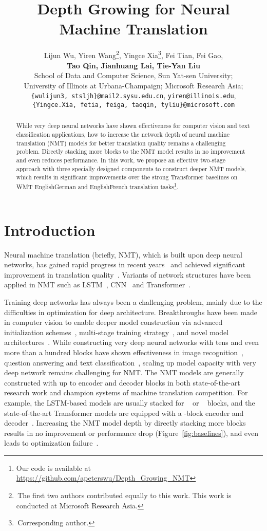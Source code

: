 \documentclass[11pt,a4paper]{article}
\title{Depth Growing for Neural Machine Translation}
\author{Lijun Wu, Yiren Wang\thanks{\;\,The first two authors contributed equally to this work. This work is conducted at Microsoft Research Asia.}, Yingce Xia\thanks{\;\,Corresponding author.}, Fei Tian, Fei Gao, \\ {\bf Tao Qin, Jianhuang Lai, Tie{-}Yan Liu }\\
  School of Data and Computer Science, Sun Yat-sen University;\\  University of Illinois at Urbana-Champaign;  Microsoft Research Asia;\\
  \texttt{\{wulijun3, stsljh\}@mail2.sysu.edu.cn}, \texttt{yiren@illinois.edu}, \\
  \texttt{\{Yingce.Xia, fetia, feiga, taoqin, tyliu\}@microsoft.com}}
\begin{document}
\maketitle
\begin{abstract}
While very deep neural networks have shown effectiveness for computer vision and text classification applications, how to increase the network depth of neural machine translation (NMT) models for better translation quality remains a challenging problem.
Directly stacking more blocks to the NMT model results in no improvement and even reduces performance. In this work, we propose an effective two-stage approach with three specially designed components to construct deeper NMT models, which results in significant improvements over the strong Transformer baselines on WMT EnglishGerman and EnglishFrench translation tasks\footnote{{Our code is available at \url{https://github.com/apeterswu/Depth_Growing_NMT}}}.
\end{abstract}

\section{Introduction}

Neural machine translation (briefly, NMT), which is built upon deep neural networks, has gained rapid progress in recent years~\citep{bahdanau2015neural,sutskever2014sequence,sennrich2016neural,he2016dual,sennrich2016improving,xia2017deliberation,wang2018multiagent} and achieved significant improvement in translation quality~\citep{hassan2018achieving}. Variants of network structures have been applied in NMT such as LSTM~\citep{wu2016google}, CNN~\citep{gehring2017convolutional} and Transformer~\citep{vaswani2017attention}.

Training deep networks has always been a challenging problem, mainly due to the difficulties in optimization for deep architecture. Breakthroughs have been made in computer vision to enable deeper model construction via advanced initialization schemes~\citep{he2015delving}, multi-stage training strategy~\citep{simonyan2015very}, and novel model architectures~\citep{srivastava2015highway,he2016deep}. While constructing very deep neural networks with tens and even more than a hundred blocks have shown effectiveness in image recognition~\citep{he2016deep}, question answering and text classification~\citep{devlin2018bert,radford2019language}, scaling up model capacity with very deep network remains challenging for NMT. The NMT models are generally constructed with up to  encoder and decoder blocks in both state-of-the-art research work and champion systems of machine translation competition. For example, the LSTM-based models are usually stacked for ~\citep{stahlberg2018university} or ~\citep{chen2018best} blocks, and the state-of-the-art Transformer models are equipped with a -block encoder and decoder~\citep{vaswani2017attention, junczys2018microsoft,edunov2018understanding}. Increasing the NMT model depth by directly stacking more blocks results in no improvement or performance drop (Figure~\ref{fig:baselines}), and even leads to optimization failure~\citep{bapna2018training}. 
\end{document}
